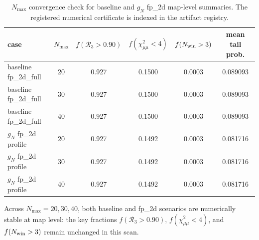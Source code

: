 \documentclass[aps,prd,onecolumn,notitlepage,nofootinbib,superscriptaddress,11pt,floatfix]{revtex4-2}
\begin{document}
\begin{table}[t]
\centering
\caption{$N_{\max}$ convergence check for baseline and $g_N$ fp\_2d map-level summaries. The registered numerical certificate is indexed in the artifact registry.}
\label{tab:gn_nmax_convergence}
\scriptsize
\begin{tabular}{lccccc}
\hline\hline
case & $N_{\max}$ & $f(\mathcal{R}_3>0.90)$ & $f(\chi^2_{\mu\mu}<4)$ & $f(N_{\rm win}>3)$ & mean tail prob. \\
\hline
baseline fp\_2d\_full & 20 & 0.927 & 0.1500 & 0.0003 & 0.089093 \\
baseline fp\_2d\_full & 30 & 0.927 & 0.1500 & 0.0003 & 0.089093 \\
baseline fp\_2d\_full & 40 & 0.927 & 0.1500 & 0.0003 & 0.089093 \\
$g_N$ fp\_2d profile & 20 & 0.927 & 0.1492 & 0.0003 & 0.081716 \\
$g_N$ fp\_2d profile & 30 & 0.927 & 0.1492 & 0.0003 & 0.081716 \\
$g_N$ fp\_2d profile & 40 & 0.927 & 0.1492 & 0.0003 & 0.081716 \\
\hline\hline
\end{tabular}
\end{table}
Across $N_{\max}=20,30,40$, both baseline and fp\_2d scenarios are numerically stable at map level: the key fractions $f(\mathcal{R}_3>0.90)$, $f(\chi^2_{\mu\mu}<4)$, and $f(N_{\rm win}>3)$ remain unchanged in this scan.
\end{document}
